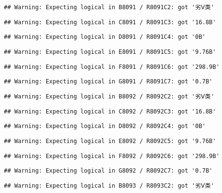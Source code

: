 \documentclass[
]{article}
\begin{document}
\begin{verbatim}
## Warning: Expecting logical in B8091 / R8091C2: got '劣Ⅴ类'
\end{verbatim}

\begin{verbatim}
## Warning: Expecting logical in C8091 / R8091C3: got '16.8B'
\end{verbatim}

\begin{verbatim}
## Warning: Expecting logical in D8091 / R8091C4: got '0B'
\end{verbatim}

\begin{verbatim}
## Warning: Expecting logical in E8091 / R8091C5: got '9.76B'
\end{verbatim}

\begin{verbatim}
## Warning: Expecting logical in F8091 / R8091C6: got '298.9B'
\end{verbatim}

\begin{verbatim}
## Warning: Expecting logical in G8091 / R8091C7: got '0.7B'
\end{verbatim}

\begin{verbatim}
## Warning: Expecting logical in B8092 / R8092C2: got '劣Ⅴ类'
\end{verbatim}

\begin{verbatim}
## Warning: Expecting logical in C8092 / R8092C3: got '16.8B'
\end{verbatim}

\begin{verbatim}
## Warning: Expecting logical in D8092 / R8092C4: got '0B'
\end{verbatim}

\begin{verbatim}
## Warning: Expecting logical in E8092 / R8092C5: got '9.76B'
\end{verbatim}

\begin{verbatim}
## Warning: Expecting logical in F8092 / R8092C6: got '298.9B'
\end{verbatim}

\begin{verbatim}
## Warning: Expecting logical in G8092 / R8092C7: got '0.7B'
\end{verbatim}

\begin{verbatim}
## Warning: Expecting logical in B8093 / R8093C2: got '劣Ⅴ类'
\end{verbatim}
\end{document}
